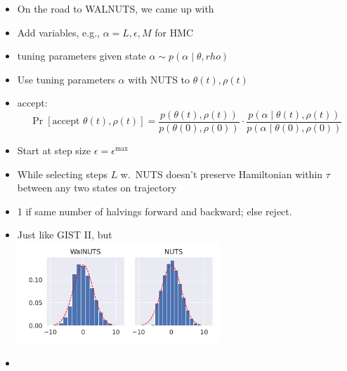 \documentclass[10pt]{report}
\begin{document}
\begin{itemize}
\item On the road to WALNUTS, we came up with 
\item Add  variables, e.g., $\alpha = L, \epsilon, M$ for HMC
\item {} tuning parameters given state $\alpha \sim p(\alpha \mid \theta, rho)$
\item Use tuning parameters $\alpha$ with NUTS to  $\theta(t), \rho(t)$
\item {} accept:
  $$
  \Pr[\textrm{accept } \theta(t), \rho(t)]
  = \dfrac{p(\theta(t), \rho(t))}{p(\theta(0), \rho(0))}
    \cdot 
    \dfrac{p(\alpha \mid \theta(t), \rho(t))}{p(\alpha \mid \theta(0), \rho(0))}
    $$
\end{itemize}

\begin{itemize}
\item Start at step size $\epsilon = \epsilon^\textrm{max}$
\item While selecting steps $L$ w.\ NUTS doesn't preserve Hamiltonian within $\tau$ between any two states on trajectory
\item {} 1 if same number of halvings forward and backward; else reject.
\end{itemize}

\begin{itemize}
\item Just like GIST II, but  \\[12pt]
  \includegraphics[width=0.6\textwidth]{img/funnel_hist.pdf}
\item {}
\end{itemize}
\end{document}
